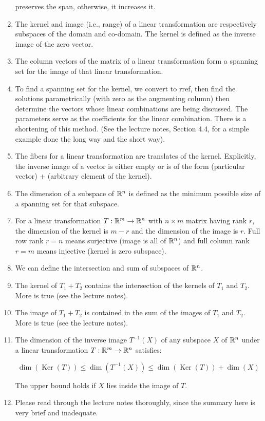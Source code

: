 \documentclass[10pt]{amsart}
\begin{document}
\begin{enumerate}
  preserves the span, otherwise, it increases it.
\item The kernel and image (i.e., range) of a linear transformation
  are respectively subspaces of the domain and co-domain. The kernel
  is defined as the inverse image of the zero vector.
\item The column vectors of the matrix of a linear transformation form
  a spanning set for the image of that linear transformation.
\item To find a spanning set for the kernel, we convert to rref, then
  find the solutions parametrically (with zero as the augmenting
  column) then determine the vectors whose linear combinations are
  being discussed. The parameters serve as the coefficients for the
  linear combination. There is a shortening of this method. (See the
  lecture notes, Section 4.4, for a simple example done the long way
  and the short way).
\item The fibers for a linear transformation are translates of the
  kernel. Explicitly, the inverse image of a vector is either empty or
  is of the form (particular vector) + (arbitrary element of the
  kernel).
\item The dimension of a subspace of $\mathbb{R}^n$ is defined as the minimum
  possible size of a spanning set for that subspace.
\item For a linear transformation $T:\mathbb{R}^m \to \mathbb{R}^n$ with $n \times m$
  matrix having rank $r$, the dimension of the kernel is $m - r$ and
  the dimension of the image is $r$. Full row rank $r = n$ means
  surjective (image is all of $\mathbb{R}^n$) and full column rank $r = m$
  means injective (kernel is zero subspace).
\item We can define the intersection and sum of subspaces of $\mathbb{R}^n$.
\item The kernel of $T_1 + T_2$ contains the intersection of the
  kernels of $T_1$ and $T_2$. More is true (see the lecture notes).
\item The image of $T_1 + T_2$ is contained in the sum of the images
  of $T_1$ and $T_2$. More is true (see the lecture notes).
\item The dimension of the inverse image $T^{-1}(X)$ of any subspace $X$
  of $\mathbb{R}^n$ under a linear transformation $T:\mathbb{R}^m \to \mathbb{R}^n$ satisfies:

$$\operatorname{dim}(\operatorname{Ker}(T)) \le \operatorname{dim}(T^{-1}(X)) \le \operatorname{dim}(\operatorname{Ker}(T)) + \operatorname{dim}(X)$$

  The upper bound holds if $X$ lies inside the image of $T$.
\item Please read through the lecture notes thoroughly, since the
  summary here is very brief and inadequate.
\end{enumerate}
\end{document}
